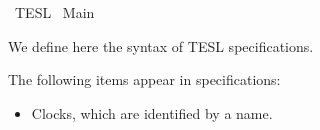 %
\begin{isabellebody}%
%
%
\isadelimdocument
%
\endisadelimdocument
%
\isatagdocument
%
\isamarkuptrue%
%
\endisatagdocument
{\isafolddocument}%
%
\isadelimdocument
%
\endisadelimdocument
%
\isadelimtheory
%
\endisadelimtheory
%
\isatagtheory
{}\isamarkupfalse%
\ TESL\isanewline
{}\ Main\isanewline
\isanewline
{}%
\endisatagtheory
{\isafoldtheory}%
%
\isadelimtheory
%
\endisadelimtheory
%
\isadelimdocument
%
\endisadelimdocument
%
\isatagdocument
%
\isamarkuptrue%
%
\endisatagdocument
{\isafolddocument}%
%
\isadelimdocument
%
\endisadelimdocument
%
\begin{isamarkuptext}%
We define here the syntax of TESL specifications.%
\end{isamarkuptext}\isamarkuptrue%
%
\isadelimdocument
%
\endisadelimdocument
%
\isatagdocument
%
\isamarkuptrue%
%
\endisatagdocument
{\isafolddocument}%
%
\isadelimdocument
%
\endisadelimdocument
%
\begin{isamarkuptext}%
The following items appear in specifications:

%
\begin{itemize}%
\item Clocks, which are identified by a name.


\end{itemize}
\end{isamarkuptext}
\end{isabellebody}
